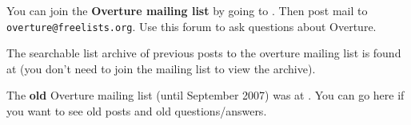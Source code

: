 You can join the {\bf Overture mailing list} by going to
. Then
post mail to {\tt overture@freelists.org}.  Use this forum to ask questions
about Overture.

The searchable list archive of previous posts to the overture mailing list
is found at  (you don't need to join the mailing list to view the archive). 



The {\bf old} Overture mailing list (until September 2007) was at 
. You can go
here if you want to see old posts and old questions/answers. 
